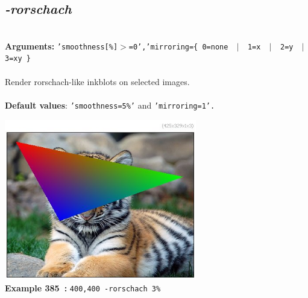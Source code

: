 \documentclass[a4paper,11pt,twoside]{book}
\begin{document}
\subsection{\emph{-rorschach} }\vspace*{-0.5em}
~\\\textbf{Arguments: } 
{\small \texttt{'smoothness[\%]$>$=0','mirroring=\{ 0=none ~$|$~ 1=x ~$|$~ 2=y ~$|$~ 3=xy \}}}\\~\\
Render rorschach-like inkblots on selected images.
~\\~\\\textbf{Default values}: {\small \texttt{'smoothness=5\%'} and \texttt{'mirroring=1'.}}
\begin{center}\includegraphics[keepaspectratio=true,height=7cm,width=\textwidth]{img/gmic_def385.jpg}\\
{\footnotesize \textbf{Example 385~:} \texttt{400,400 -rorschach 3\%}}
\end{center}
\end{document}
